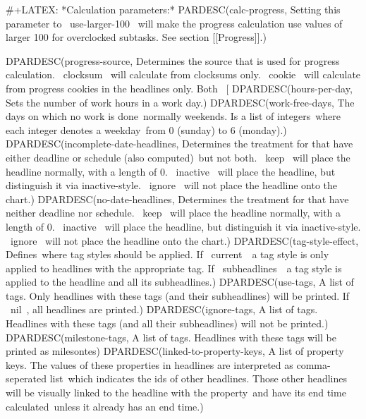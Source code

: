 #+LATEX: \noindent
*Calculation parameters:*
{{{PARDESC(calc-progress, Setting this parameter to ~use-larger-100~ will make the progress calculation use values of larger 100 for overclocked subtasks. See section [[Progress]].)}}}
{{{DPARDESC(progress-source, Determines the source that is used for progress calculation. ~clocksum~ will calculate from clocksums only. ~cookie~ will calculate from progress cookies in the headlines only. Both ~[%
{{{DPARDESC(hours-per-day, Sets the number of work hours in a work day.)}}}
{{{DPARDESC(work-free-days, The days on which no work is done\, normally weekends. Is a list of integers\, where each integer denotes a weekday\, from 0 (sunday) to 6 (monday).)}}}
{{{DPARDESC(incomplete-date-headlines, Determines the treatment for that have either deadline or schedule (also computed)\, but not both. ~keep~ will place the headline normally, with a length of 0. ~inactive~ will place the headline, but distinguish it via inactive-style. ~ignore~ will not place the headline onto the chart.)}}}
{{{DPARDESC(no-date-headlines, Determines the treatment for that have neither deadline nor schedule. ~keep~ will place the headline normally, with a length of 0. ~inactive~ will place the headline, but distinguish it via inactive-style. ~ignore~ will not place the headline onto the chart.)}}}
{{{DPARDESC(tag-style-effect, Defines\, where tag styles should be applied. If ~current~\, a tag style is only applied to headlines with the appropriate tag. If ~subheadlines~\, a tag style is applied to the headline and all its subheadlines.)}}}
{{{DPARDESC(use-tags, A list of tags. Only headlines with these tags (and their subheadlines) will be printed. If ~nil~, all headlines are printed.)}}}
{{{DPARDESC(ignore-tags, A list of tags. Headlines with these tags (and all their subheadlines) will not be printed.)}}}
{{{DPARDESC(milestone-tags, A list of tags. Headlines with these tags will be printed as milesontes)}}}
{{{DPARDESC(linked-to-property-keys, A list of property keys. The values of these properties in headlines are interpreted as comma-seperated list\, which indicates the ids of other headlines. Those other headlines will be visually linked to the headline with the property\, and have its end time calculated\, unless it already has an end time.)}}}

}}}
